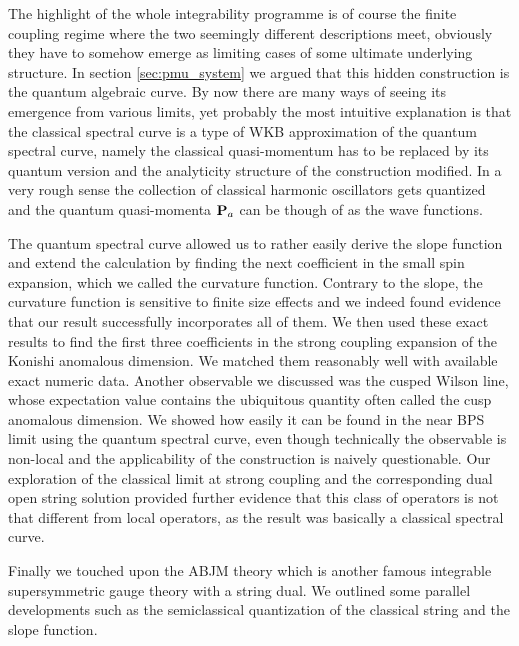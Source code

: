 The highlight of the whole integrability programme is of course the finite coupling regime where the two seemingly different descriptions meet, obviously they have to somehow emerge as limiting cases of some ultimate underlying structure.
In section \ref{sec:pmu_system} we argued that this hidden construction is the quantum algebraic curve. 
By now there are many ways of seeing its emergence from various limits, yet probably the most intuitive explanation is that the classical spectral curve is a type of WKB approximation of the quantum spectral curve, namely the classical quasi-momentum has to be replaced by its quantum version and the analyticity structure of the construction modified.
In a very rough sense the collection of classical harmonic oscillators gets quantized and the quantum quasi-momenta ${\bf P}_a$ can be though of as the wave functions. 

The quantum spectral curve allowed us to rather easily derive the slope function and extend the calculation by finding the next coefficient in the small spin expansion, which we called the curvature function.
Contrary to the slope, the curvature function is sensitive to finite size effects and we indeed found evidence that our result successfully incorporates all of them.
We then used these exact results to find the first three coefficients in the strong coupling expansion of the Konishi anomalous dimension.
We matched them reasonably well with available exact numeric data.
Another observable we discussed was the cusped Wilson line, whose expectation value contains the ubiquitous quantity often called the cusp anomalous dimension.
We showed how easily it can be found in the near BPS limit using the quantum spectral curve, even though technically the observable is non-local and the applicability of the construction is naively questionable.
Our exploration of the classical limit at strong coupling and the corresponding dual open string solution provided further evidence that this class of operators is not that different from local operators, as the result was basically a classical spectral curve.

Finally we touched upon the ABJM theory which is another famous integrable supersymmetric gauge theory with a string dual.
We outlined some parallel developments such as the semiclassical quantization of the classical string and the slope function. 

